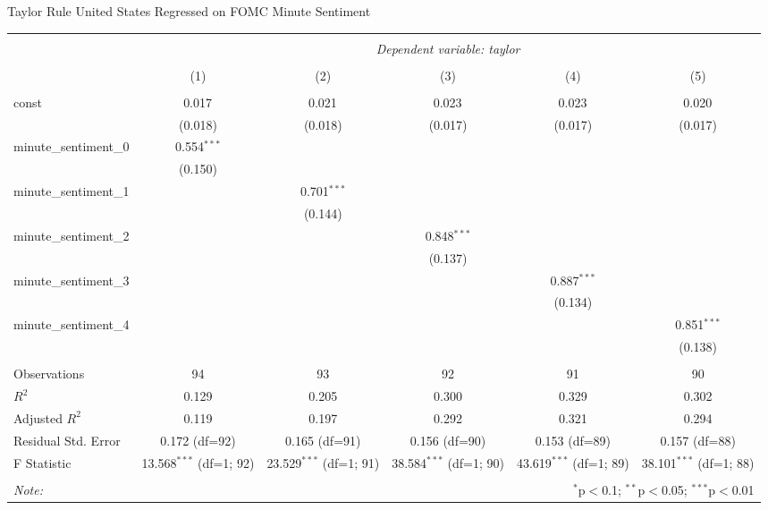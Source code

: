 \documentclass{article}
\begin{document}
Taylor Rule United States Regressed on FOMC Minute Sentiment

\begin{table}[H] 
\begin{adjustbox}{width=\textwidth}
\centering
\begin{tabular}{@{\extracolsep{5pt}}lccccc}
\\[-1.8ex]\hline
\hline \\[-1.8ex]
& \multicolumn{5}{c}{\textit{Dependent variable: taylor}} \\
\cline{2-6}
\\[-1.8ex] & (1) & (2) & (3) & (4) & (5) \\
\hline \\[-1.8ex]
const & 0.017$^{}$ & 0.021$^{}$ & 0.023$^{}$ & 0.023$^{}$ & 0.020$^{}$ \\
& (0.018) & (0.018) & (0.017) & (0.017) & (0.017) \\
minute\_sentiment\_0 & 0.554$^{***}$ & & & & \\
& (0.150) & & & & \\
minute\_sentiment\_1 & & 0.701$^{***}$ & & & \\
& & (0.144) & & & \\
minute\_sentiment\_2 & & & 0.848$^{***}$ & & \\
& & & (0.137) & & \\
minute\_sentiment\_3 & & & & 0.887$^{***}$ & \\
& & & & (0.134) & \\
minute\_sentiment\_4 & & & & & 0.851$^{***}$ \\
& & & & & (0.138) \\
\hline \\[-1.8ex]
Observations & 94 & 93 & 92 & 91 & 90 \\
$R^2$ & 0.129 & 0.205 & 0.300 & 0.329 & 0.302 \\
Adjusted $R^2$ & 0.119 & 0.197 & 0.292 & 0.321 & 0.294 \\
Residual Std. Error & 0.172 (df=92) & 0.165 (df=91) & 0.156 (df=90) & 0.153 (df=89) & 0.157 (df=88) \\
F Statistic & 13.568$^{***}$ (df=1; 92) & 23.529$^{***}$ (df=1; 91) & 38.584$^{***}$ (df=1; 90) & 43.619$^{***}$ (df=1; 89) & 38.101$^{***}$ (df=1; 88) \\
\hline
\hline \\[-1.8ex]
\textit{Note:} & \multicolumn{5}{r}{$^{*}$p$<$0.1; $^{**}$p$<$0.05; $^{***}$p$<$0.01} \\
\end{tabular}
\end{adjustbox}
\end{table}
\end{document}
